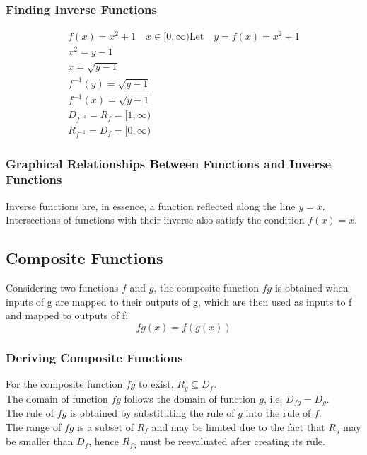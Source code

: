 \documentclass[../main]{subfiles}
\begin{document}
	\subsubsection{Finding Inverse Functions}
	\begin{equation*} \begin{gathered}
		f(x) = x^2 + 1 \quad x \in [0,\infty)
		\text{Let} \quad y = f(x) = x^2 + 1 \\
		x^2 = y - 1 \\
		x = \sqrt{y - 1} \\
		f^{-1}(y) = \sqrt{y-1} \\
		f^{-1}(x) = \sqrt{y-1} \\
		D_{f^{-1}} = R_f = [1,\infty) \\
		R_{f^{-1}} = D_f = [0,\infty) 
	\end{gathered} \end{equation*}
	\subsubsection{Graphical Relationships Between Functions and Inverse Functions}
	Inverse functions are, in essence, a function reflected along the line \(y=x\). \\
	Intersections of functions with their inverse also satisfy the condition \(f(x)=x\). 

\subsection{Composite Functions}
	Considering two functions \(f\) and \(g\), the composite function \(fg\) is obtained when inputs of g are mapped to their outputs of g, which are then used as inputs to f and mapped to outputs of f:
	\[ fg(x) = f(g(x)) \]
	\subsubsection{Deriving Composite Functions}
	For the composite function \(fg\) to exist, \(R_g \subseteq D_f\). \\
	The domain of function \(fg\) follows the domain of function \(g\), i.e. \(D_{fg} = D_g\). \\
	The rule of \(fg\) is obtained by substituting the rule of \(g\) into the rule of \(f\). \\
	The range of \(fg\) is a subset of \(R_f\) and may be limited due to the fact that \(R_g\) may be smaller than \(D_f\), hence \(R_{fg}\) must be reevaluated after creating its rule.
\end{document}
